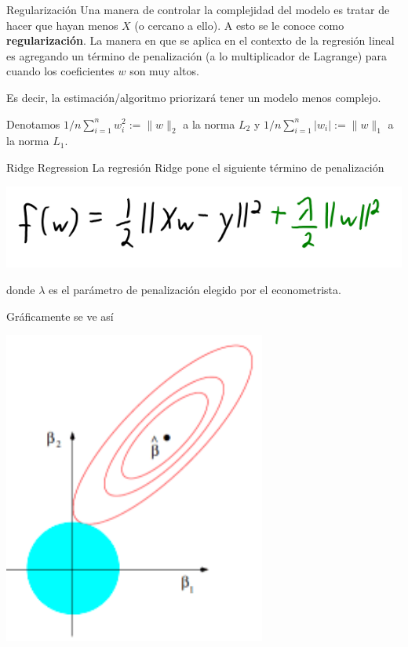 \documentclass[11pt,handout,aspectratio=169]{beamer}
\begin{document}
\begin{frame}{Regularización}
Una manera de controlar la complejidad del modelo es tratar de hacer que hayan menos $X$ (o cercano a ello). 
\vspace{0.8cm}
A esto se le conoce como \textbf{regularización}. La manera en que se aplica en el contexto de la regresión lineal es agregando un término de penalización (a lo multiplicador de Lagrange) para cuando los coeficientes $w$ son muy altos. 
\vspace{0.8cm}

Es decir, la estimación/algoritmo priorizará tener un modelo menos complejo.
\vspace{.8cm}

Denotamos $1/n \sum_{i=1}^n w_i^2 := \lVert w \rVert_2$ a la norma $L_2$ y  $1/n  \sum_{i=1}^n \lvert w_i \rvert := \lVert w \rVert_1$ a la norma $L_1$.

\end{frame}


\begin{frame}{Ridge Regression}
La regresión Ridge pone el siguiente término de penalización
\begin{center}
\includegraphics[scale=0.5]{l2_regularization.png}
\end{center}
donde $\lambda$ es el parámetro de penalización elegido por el econometrista. 

Gráficamente se ve así
\begin{center}
\includegraphics[scale=0.4]{ridge_minimization.png}
\end{center}

\end{frame}
\end{document}
